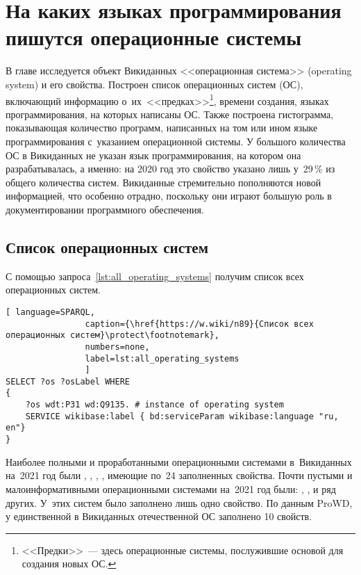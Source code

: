 \chapter{На каких языках программирования пишутся операционные системы}
\label{ch:operating-sysmets}

В главе исследуется объект Викиданных <<операционная система>> (operating system) и его свойства. 
Построен список операционных систем (ОС), включающий информацию о~их~<<предках>>\footnote{%
%
<<Предки>>~--- здесь операционные системы, послужившие основой для создания новых ОС.%
%
}, 
времени создания, языках программирования, на которых написаны ОС. 
Также построена гистограмма, показывающая количество программ, 
написанных на том или ином языке программирования с~указанием операционной системы. 
У большого количества ОС в Викиданных не указан язык программирования, 
на котором она разрабатывалась, а именно: 
на 2020 год это свойство указано лишь у~29\,\% из общего количества систем. 
Викиданные стремительно пополняются новой информацией, что особенно отрадно, 
поскольку они играют большую роль в документировании программного обеспечения.



\section{Список операционных систем}
С помощью запроса~\ref{lst:all_operating_systems} получим список всех операционных систем.
\begin{lstlisting}[ language=SPARQL, 
                caption={\href{https://w.wiki/n89}{Список всех операционных систем}\protect\footnotemark},
                numbers=none,
                label=lst:all_operating_systems
	            ]
SELECT ?os ?osLabel WHERE
{
    ?os wdt:P31 wd:Q9135. # instance of operating system
    SERVICE wikibase:label { bd:serviceParam wikibase:language "ru, en"}
}
\end{lstlisting}


Наиболее полными и проработанными операционными системами в~Викиданных на~2021 год были 
, 
, 
, 
, имеющие по~24 заполненных свойства. %
Почти пустыми и малоинформативными операционными системами на~2021 год были: 
, ,  и ряд других. 
У~этих систем было заполнено лишь одно свойство. %
%
По данным ProWD, у единственной в Викиданных отечественной ОС 
 заполнено 10 свойств. %




